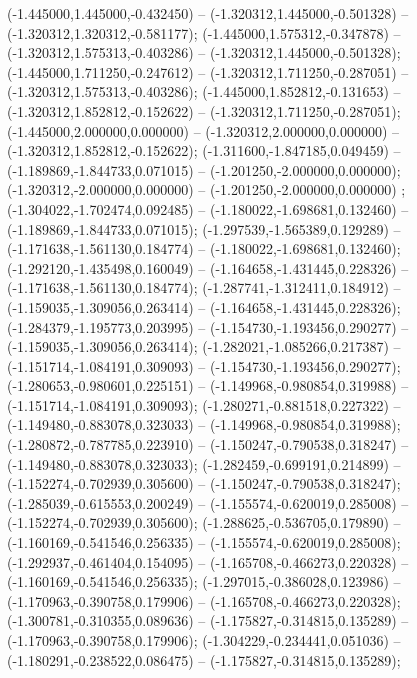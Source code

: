  (-1.445000,1.445000,-0.432450) -- (-1.320312,1.445000,-0.501328) -- (-1.320312,1.320312,-0.581177);
 (-1.445000,1.575312,-0.347878) -- (-1.320312,1.575313,-0.403286) -- (-1.320312,1.445000,-0.501328);
 (-1.445000,1.711250,-0.247612) -- (-1.320312,1.711250,-0.287051) -- (-1.320312,1.575313,-0.403286);
 (-1.445000,1.852812,-0.131653) -- (-1.320312,1.852812,-0.152622) -- (-1.320312,1.711250,-0.287051);
 (-1.445000,2.000000,0.000000) -- (-1.320312,2.000000,0.000000) -- (-1.320312,1.852812,-0.152622);
 (-1.311600,-1.847185,0.049459) -- (-1.189869,-1.844733,0.071015) -- (-1.201250,-2.000000,0.000000);
 (-1.320312,-2.000000,0.000000) -- (-1.201250,-2.000000,0.000000) ;
 (-1.304022,-1.702474,0.092485) -- (-1.180022,-1.698681,0.132460) -- (-1.189869,-1.844733,0.071015);
 (-1.297539,-1.565389,0.129289) -- (-1.171638,-1.561130,0.184774) -- (-1.180022,-1.698681,0.132460);
 (-1.292120,-1.435498,0.160049) -- (-1.164658,-1.431445,0.228326) -- (-1.171638,-1.561130,0.184774);
 (-1.287741,-1.312411,0.184912) -- (-1.159035,-1.309056,0.263414) -- (-1.164658,-1.431445,0.228326);
 (-1.284379,-1.195773,0.203995) -- (-1.154730,-1.193456,0.290277) -- (-1.159035,-1.309056,0.263414);
 (-1.282021,-1.085266,0.217387) -- (-1.151714,-1.084191,0.309093) -- (-1.154730,-1.193456,0.290277);
 (-1.280653,-0.980601,0.225151) -- (-1.149968,-0.980854,0.319988) -- (-1.151714,-1.084191,0.309093);
 (-1.280271,-0.881518,0.227322) -- (-1.149480,-0.883078,0.323033) -- (-1.149968,-0.980854,0.319988);
 (-1.280872,-0.787785,0.223910) -- (-1.150247,-0.790538,0.318247) -- (-1.149480,-0.883078,0.323033);
 (-1.282459,-0.699191,0.214899) -- (-1.152274,-0.702939,0.305600) -- (-1.150247,-0.790538,0.318247);
 (-1.285039,-0.615553,0.200249) -- (-1.155574,-0.620019,0.285008) -- (-1.152274,-0.702939,0.305600);
 (-1.288625,-0.536705,0.179890) -- (-1.160169,-0.541546,0.256335) -- (-1.155574,-0.620019,0.285008);
 (-1.292937,-0.461404,0.154095) -- (-1.165708,-0.466273,0.220328) -- (-1.160169,-0.541546,0.256335);
 (-1.297015,-0.386028,0.123986) -- (-1.170963,-0.390758,0.179906) -- (-1.165708,-0.466273,0.220328);
 (-1.300781,-0.310355,0.089636) -- (-1.175827,-0.314815,0.135289) -- (-1.170963,-0.390758,0.179906);
 (-1.304229,-0.234441,0.051036) -- (-1.180291,-0.238522,0.086475) -- (-1.175827,-0.314815,0.135289);
